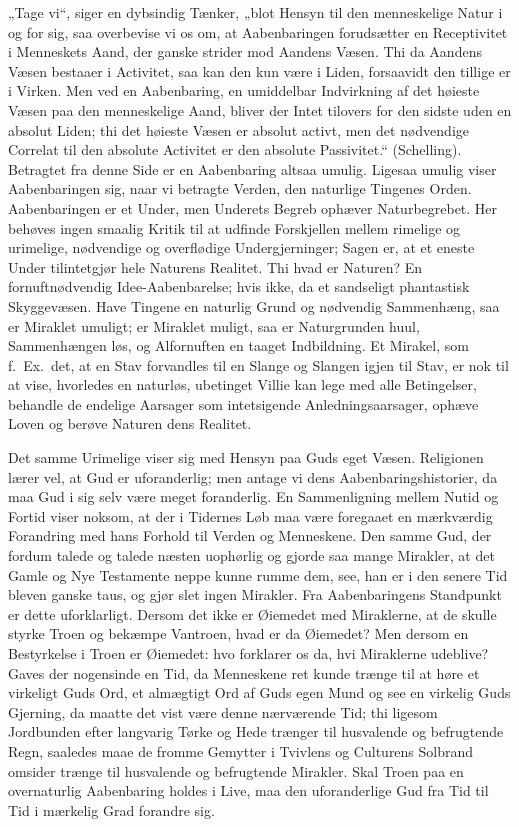 \documentclass[12pt]{book}
\begin{document}
„Tage vi“, siger en dybsindig Tænker, „blot Hensyn til den
menneskelige Natur i og for sig, saa overbevise vi os om, at
Aabenbaringen forudsætter en Receptivitet i Menneskets Aand, der
ganske strider mod Aandens Væsen. Thi da Aandens Væsen bestaaer i
Activitet, saa kan den kun være i Liden, forsaavidt den tillige er i
Virken. Men ved en Aabenbaring, en umiddelbar Indvirkning af det
høieste Væsen paa den menneskelige Aand, bliver der Intet tilovers
for den sidste uden en absolut Liden; thi det høieste Væsen er
absolut activt,
men det nødvendige Correlat til den absolute Activitet er den
absolute Passivitet.“ (Schelling). Betragtet fra denne Side er en
Aabenbaring altsaa umulig. Ligesaa umulig viser Aabenbaringen sig,
naar vi betragte Verden, den naturlige Tingenes Orden.
Aabenbaringen er et Under, men Underets Begreb ophæver
Naturbegrebet. Her behøves ingen smaalig Kritik til at udfinde
Forskjellen mellem rimelige og urimelige, nødvendige og overflødige
Undergjerninger; Sagen er, at et eneste Under tilintetgjør hele
Naturens Realitet. Thi hvad er Naturen? En fornuftnødvendig
Idee-Aabenbarelse; hvis ikke, da et sandseligt phantastisk
Skyggevæsen. Have Tingene en naturlig Grund og nødvendig
Sammenhæng, saa er Miraklet umuligt; er Miraklet muligt, saa er
Naturgrunden huul, Sammenhængen løs, og Alfornuften en taaget
Indbildning. Et Mirakel, som f.\ Ex.\ det, at en Stav forvandles til
en Slange og Slangen igjen til Stav, er nok til at vise, hvorledes
en naturløs, ubetinget Villie kan lege med alle Betingelser,
behandle de endelige Aarsager som intetsigende Anledningsaarsager,
ophæve Loven og berøve Naturen dens Realitet.

Det samme Urimelige viser sig med Hensyn paa Guds eget Væsen.
Religionen lærer vel, at Gud er uforanderlig; men antage vi dens
Aabenbaringshistorier, da maa Gud i sig selv være meget
foranderlig. En Sammenligning mellem Nutid og Fortid viser noksom,
at der i Tidernes Løb maa være foregaaet en mærkværdig Forandring
med hans Forhold til Verden og Menneskene. Den samme Gud, der fordum
talede og talede næsten uophørlig og gjorde saa mange Mirakler, at
det Gamle og Nye Testamente neppe kunne rumme dem, see, han er i den
senere Tid bleven ganske taus, og gjør slet ingen Mirakler. Fra
Aabenbaringens Standpunkt er dette uforklarligt. Dersom det ikke er
Øiemedet med Miraklerne, at de skulle styrke Troen og bekæmpe
Vantroen,
hvad er da Øiemedet? Men dersom en Bestyrkelse i Troen er Øiemedet:
hvo forklarer os da, hvi Miraklerne udeblive? Gaves der nogensinde
en Tid, da Menneskene ret kunde trænge til at høre et virkeligt Guds
Ord, et almægtigt Ord af Guds egen Mund og see en virkelig Guds
Gjerning, da maatte det vist være denne nærværende Tid; thi ligesom
Jordbunden efter langvarig Tørke og Hede trænger til husvalende og
befrugtende Regn, saaledes maae de fromme Gemytter i Tvivlens og
Culturens Solbrand omsider trænge til husvalende og befrugtende
Mirakler. Skal Troen paa en overnaturlig Aabenbaring holdes i Live,
maa den uforanderlige Gud fra Tid til Tid i mærkelig Grad forandre
sig.
\end{document}
